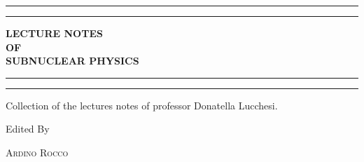 \begin{titlepage} %

	\centering %

	\scshape %

	\vspace*{\baselineskip} %


	\rule{\textwidth}{1.6pt}\vspace*{-\baselineskip}\vspace*{2pt} %
	\rule{\textwidth}{0.4pt} %

	\vspace{0.75\baselineskip} %

	\textbf{\LARGE LECTURE NOTES\\ OF\\ SUBNUCLEAR PHYSICS \\} %

	\vspace{0.75\baselineskip} %

	\rule{\textwidth}{0.4pt}\vspace*{-\baselineskip}\vspace{3.2pt} %
	\rule{\textwidth}{1.6pt} %

	\vspace{2\baselineskip} %

	Collection of the lectures notes of professor Donatella Lucchesi.

	\vspace*{3\baselineskip} %


	Edited By

	\vspace{0.5\baselineskip} %

	{\scshape\Large Ardino Rocco \\} %


\end{titlepage}
